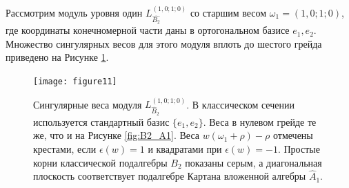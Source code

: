 Рассмотрим модуль уровня один $L^{\left( 1,0;1;0 \right)}_{\hat{B_2}}$  со старшим весом  $\omega_1=(1,0;1;0)$, где координаты конечномерной части даны в ортогональном базисе $e_1,e_2$. Множество сингулярных весов для этого модуля вплоть до шестого грейда приведено на Рисунке \ref{fig:affine_B2_anom_point}.

\begin{figure}[h!tb]
  \texttt{[image: figure11]}
  \caption{Сингулярные веса модуля $L^{(1,0;1;0)}_{\hat B_2 }$. В классическом сечении используется стандартный базис  $\{e_1,e_2\}$. Веса в нулевом грейде те же, что и на Рисунке \ref{fig:B2_A1}. Веса  $w (\omega_1+\rho)-\rho$ отмечены крестами, если $\epsilon(w)=1$ и квадратами при $\epsilon(w)=-1$. Простые корни классической подалгебры  $B_2$ показаны серым, а диагональная плоскость соответствует подалгебре Картана вложенной алгебры $\hat{A}_1$.}
  \label{fig:affine_B2_anom_point}
\end{figure}

